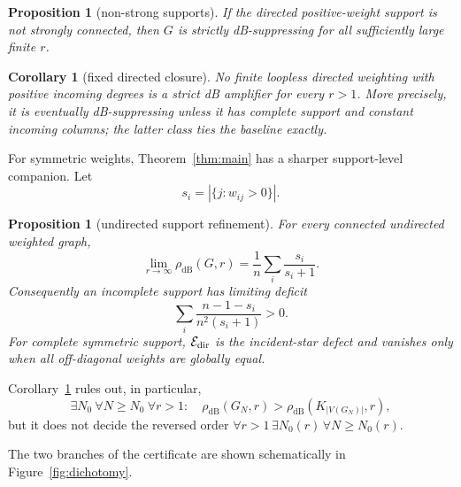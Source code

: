 \documentclass[11pt]{article}
\newtheorem{proposition}[theorem]{Proposition}
\newtheorem{corollary}[theorem]{Corollary}
\newcommand{\dB}{\mathrm{dB}}
\begin{document}
\begin{proposition}[non-strong supports]\label{prop:nonstrong}
If the directed positive-weight support is not strongly connected, then $G$
is strictly dB-suppressing for all sufficiently large finite $r$.
\end{proposition}

\begin{corollary}[fixed directed closure]\label{cor:directed-closure}
No finite loopless directed weighting with positive incoming degrees is a
strict dB amplifier for every $r>1$.  More precisely, it is eventually
dB-suppressing unless it has complete support and constant incoming columns;
the latter class ties the baseline exactly.
\end{corollary}

For symmetric weights, Theorem~\ref{thm:main} has a sharper support-level
companion.  Let
\[
 s_i=|\{j:w_{ij}>0\}|.
\]
\par\medskip

\begin{proposition}[undirected support refinement]\label{prop:undirected}
For every connected undirected weighted graph,
\[
 \lim_{r\to\infty}\rho_{\dB}(G,r)
 =\frac1n\sum_i\frac{s_i}{s_i+1}.
\]
Consequently an incomplete support has limiting deficit
\[
 \sum_i\frac{n-1-s_i}{n^2(s_i+1)}>0.
\]
For complete symmetric support, $\mathcal E_{\rm dir}$ is the incident-star
defect and vanishes only when all off-diagonal weights are globally equal.
\end{proposition}

Corollary~\ref{cor:directed-closure} rules out, in particular,
\[
 \exists N_0\ \forall N\ge N_0\ \forall r>1:\quad
 \rho_{\dB}(G_N,r)>\rho_{\dB}(K_{|V(G_N)|},r),
\]
but it does not decide the reversed order
$\forall r>1\,\exists N_0(r)\,\forall N\ge N_0(r)$.

The two branches of the certificate are shown schematically in
Figure~\ref{fig:dichotomy}.
\end{document}
